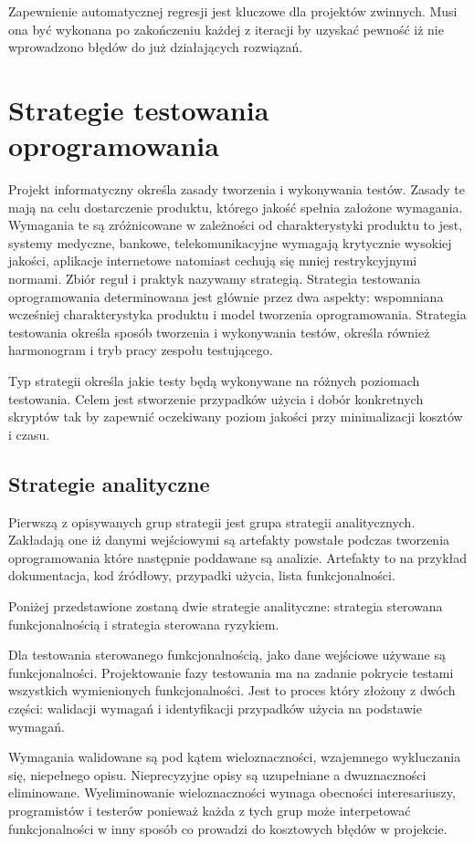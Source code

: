 Zapewnienie automatycznej regresji jest kluczowe dla projektów zwinnych. Musi ona być wykonana po zakończeniu każdej z iteracji by uzyskać pewność iż nie wprowadzono błędów do już działających rozwiązań.

\section{Strategie testowania oprogramowania}
\label{cha:strategie testowania}
Projekt informatyczny określa zasady tworzenia i wykonywania testów. Zasady te mają na celu dostarczenie produktu, którego jakość spełnia założone wymagania. Wymagania te są zróżnicowane w zależności od charakterystyki produktu to jest, systemy medyczne, bankowe, telekomunikacyjne wymagają krytycznie wysokiej jakości, aplikacje internetowe natomiast cechują się mniej restrykcyjnymi normami. Zbiór reguł i praktyk nazywamy strategią. Strategia testowania oprogramowania determinowana jest głównie przez dwa aspekty: wspomniana wcześniej charakterystyka produktu i model tworzenia oprogramowania. 
Strategia testowania określa sposób tworzenia i wykonywania testów, określa również harmonogram i tryb pracy zespołu testującego.

Typ strategii określa jakie testy będą wykonywane na różnych poziomach testowania. Celem jest stworzenie przypadków użycia i dobór konkretnych skryptów tak by zapewnić oczekiwany poziom jakości przy minimalizacji kosztów i czasu.
\subsection{Strategie analityczne}
Pierwszą z opisywanych grup strategii jest grupa strategii analitycznych. Zakładają one iż danymi wejściowymi są artefakty powstałe podczas tworzenia oprogramowania które następnie poddawane są analizie. Artefakty to na przykład dokumentacja, kod źródłowy, przypadki użycia, lista funkcjonalności.

Poniżej przedstawione zostaną dwie strategie analityczne: strategia sterowana funkcjonalnością i strategia sterowana ryzykiem. 

Dla testowania sterowanego funkcjonalnością, jako dane wejściowe używane są funkcjonalności. Projektowanie fazy testowania ma na zadanie pokrycie testami wszystkich wymienionych funkcjonalności. Jest to proces który złożony z dwóch części: walidacji wymagań i identyfikacji przypadków użycia na podstawie wymagań. 

Wymagania walidowane są pod kątem wieloznaczności, wzajemnego wykluczania się, niepełnego opisu. Nieprecyzyjne opisy są uzupełniane a dwuznaczności eliminowane. Wyeliminowanie wieloznaczności wymaga obecności interesariuszy, programistów i testerów ponieważ każda z tych grup może interpetować funkcjonalności w inny sposób co prowadzi do kosztowych błędów w projekcie.

